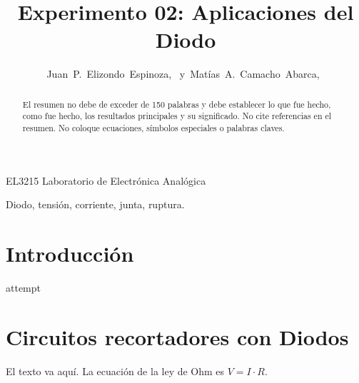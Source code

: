 \documentclass[journal]{IEEEtran}
\begin{document}
%
\title{Experimento 02: Aplicaciones del Diodo}


\author{Juan~P.~Elizondo~Espinoza,~
        y~Matías~A.~Camacho~Abarca,~
}


%
{EL3215 Laboratorio de Electrónica Analógica}


\maketitle


\begin{abstract}
El resumen no debe de exceder de 150 palabras y debe establecer lo que fue hecho, como fue hecho, los resultados principales y su significado. No cite referencias en el resumen. No coloque ecuaciones, símbolos especiales o palabras claves.
\end{abstract}

\begin{IEEEkeywords}
Diodo, tensión, corriente, junta, ruptura.
\end{IEEEkeywords}


\section{Introducción}

 attempt

\section{Circuitos recortadores con Diodos}
El texto va aquí. La ecuación de la ley de Ohm es $V=I\cdot R$.
\end{document}
